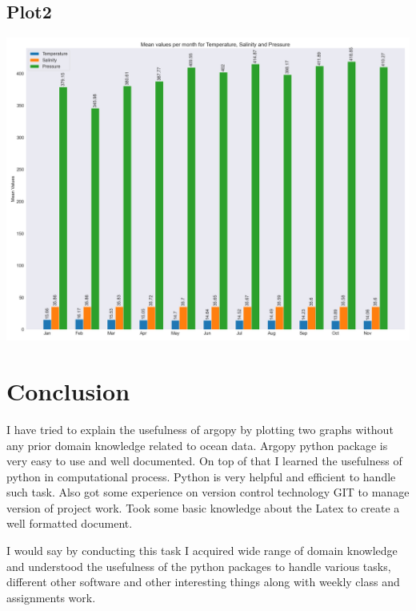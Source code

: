 \documentclass[12pt, letterpaper]{article}
\begin{document}
\subsection{Plot2}
 \includegraphics[width=\textwidth]{plot2.png}



\section{Conclusion}

I have tried to explain the usefulness of argopy by plotting two graphs without any prior domain knowledge related to ocean data. Argopy python package is very easy to use and well documented. On top of that I learned the usefulness of python in computational process. Python is very helpful and efficient to handle such task. Also got some experience on version control technology GIT to manage version of project work. Took some basic knowledge about the Latex to create a well formatted document.

I would say by conducting this task I acquired wide range of domain knowledge and understood the usefulness of the python packages to handle various tasks, different other software and other interesting things along with weekly class and assignments work.
\end{document}
